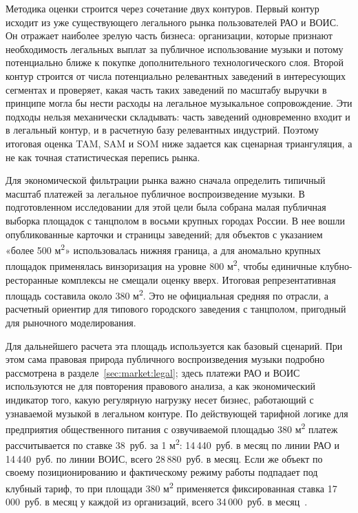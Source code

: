 Методика оценки строится через сочетание двух контуров. Первый контур исходит из уже существующего легального рынка пользователей РАО и ВОИС. Он отражает наиболее зрелую часть бизнеса: организации, которые признают необходимость легальных выплат за публичное использование музыки и потому потенциально ближе к покупке дополнительного технологического слоя. Второй контур строится от числа потенциально релевантных заведений в интересующих сегментах и проверяет, какая часть таких заведений по масштабу выручки в принципе могла бы нести расходы на легальное музыкальное сопровождение. Эти подходы нельзя механически складывать: часть заведений одновременно входит и в легальный контур, и в расчетную базу релевантных индустрий. Поэтому итоговая оценка TAM, SAM и SOM ниже задается как сценарная триангуляция, а не как точная статистическая перепись рынка.

Для экономической фильтрации рынка важно сначала определить типичный масштаб платежей за легальное публичное воспроизведение музыки. В подготовленном исследовании для этой цели была собрана малая публичная выборка площадок с танцполом в восьми крупных городах России. В нее вошли опубликованные карточки и страницы заведений; для объектов с указанием «более 500 м\textsuperscript{2}» использовалась нижняя граница, а для аномально крупных площадок применялась винзоризация на уровне 800 м\textsuperscript{2}, чтобы единичные клубно-ресторанные комплексы не смещали оценку вверх. Итоговая репрезентативная площадь составила около 380 м\textsuperscript{2}. Это не официальная средняя по отрасли, а расчетный ориентир для типового городского заведения с танцполом, пригодный для рыночного моделирования.

Для дальнейшего расчета эта площадь используется как базовый сценарий. При этом сама правовая природа публичного воспроизведения музыки подробно рассмотрена в разделе~\ref{sec:market:legal}; здесь платежи РАО и ВОИС используются не для повторения правового анализа, а как экономический индикатор того, какую регулярную нагрузку несет бизнес, работающий с узнаваемой музыкой в легальном контуре. По действующей тарифной логике для предприятия общественного питания с озвучиваемой площадью 380 м\textsuperscript{2} платеж рассчитывается по ставке 38~руб. за 1 м\textsuperscript{2}: 14\,440~руб. в месяц по линии РАО и 14\,440~руб. по линии ВОИС, всего 28\,880~руб. в месяц. Если же объект по своему позиционированию и фактическому режиму работы подпадает под клубный тариф, то при площади 380 м\textsuperscript{2} применяется фиксированная ставка 17\,000~руб. в месяц у каждой из организаций, всего 34\,000~руб. в месяц~\cite{rao_tariffs_2024,vois_tariffs_2024}.

